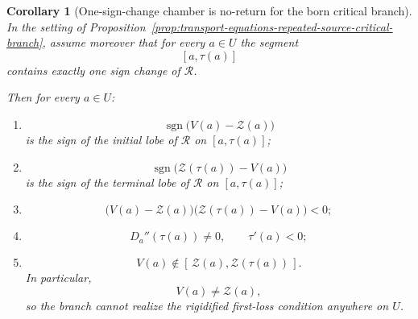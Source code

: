 \documentclass[11pt,a4paper]{amsart}
\theoremstyle{plain}
\newtheorem{corollary}[theorem]{Corollary}
\theoremstyle{definition}
\begin{document}
\begin{corollary}[One-sign-change chamber is no-return for the born critical branch]
\label{cor:one-sign-change-chamber-no-return}
In the setting of
Proposition~\ref{prop:transport-equations-repeated-source-critical-branch},
assume moreover that for every $a\in U$ the segment
\[
[a,\tau(a)]
\]
contains exactly one sign change of $\mathcal R$.

Then for every $a\in U$:
\begin{enumerate}
\item
\[
\operatorname{sgn}\bigl(V(a)-\mathcal Z(a)\bigr)
\]
is the sign of the initial lobe of $\mathcal R$ on $[a,\tau(a)]$;

\item
\[
\operatorname{sgn}\bigl(\mathcal Z(\tau(a))-V(a)\bigr)
\]
is the sign of the terminal lobe of $\mathcal R$ on $[a,\tau(a)]$;

\item
\[
\bigl(V(a)-\mathcal Z(a)\bigr)\bigl(\mathcal Z(\tau(a))-V(a)\bigr)<0;
\]

\item
\[
D_a''(\tau(a))\neq 0,
\qquad
\tau'(a)<0;
\]

\item
\[
V(a)\notin [\,\mathcal Z(a),\mathcal Z(\tau(a))\,].
\]
In particular,
\[
V(a)\neq \mathcal Z(a),
\]
so the branch cannot realize the rigidified first-loss condition anywhere on
$U$.
\end{enumerate}
\end{corollary}
\end{document}
